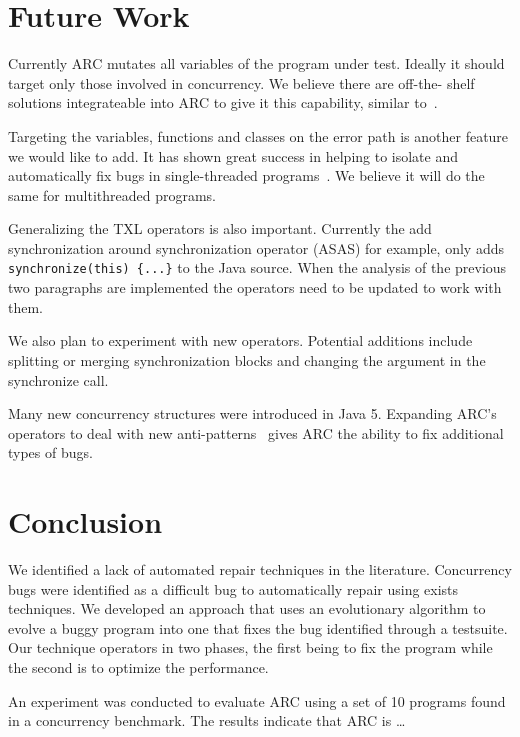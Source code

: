\documentclass[10pt, conference, compsocconf]{IEEEtran}
\begin{document}


\section{Future Work}
\label{sec:future_work}

Currently ARC mutates all variables of the program under test. Ideally it
should target only those involved in concurrency. We believe there are off-the-
shelf solutions integrateable into ARC to give it this capability, similar
to~\cite{CM08, HP00}.

Targeting the variables, functions and classes on the error path is another
feature we would like to add.  It has shown great success in helping to isolate
and automatically fix bugs in single-threaded programs~\cite{FNWG09, NWLF09,
WFGN10, GNFW11}. We believe it will do the same for multithreaded programs.

Generalizing the TXL operators is also important. Currently the add
synchronization around synchronization operator (ASAS) for example, only adds
\texttt{synchronize(this) \{...\}} to the Java source.  When the analysis of
the previous two paragraphs are implemented the operators need to be updated to
work with them.

We also plan to experiment with new operators.  Potential additions include
splitting or merging synchronization blocks and changing the argument in the
synchronize call.

Many new concurrency structures were introduced in Java 5. Expanding ARC's
operators to deal with new anti-patterns~\cite{BJ09, BCD06} gives ARC the 
ability to fix additional types of bugs.

\section{Conclusion}
\label{sec:conclusion}

We identified a lack of automated repair techniques in the literature.
Concurrency bugs were identified as a difficult bug to automatically repair
using exists techniques. We developed an approach that uses an evolutionary
algorithm to evolve a buggy program into one that fixes the bug identified
through a testsuite. Our technique operators in two phases, the first being to
fix the program while the second is to optimize the performance.

An experiment was conducted to evaluate ARC using a set of 10 programs found in
a concurrency benchmark. The results indicate that ARC is \ldots %
\end{document}
